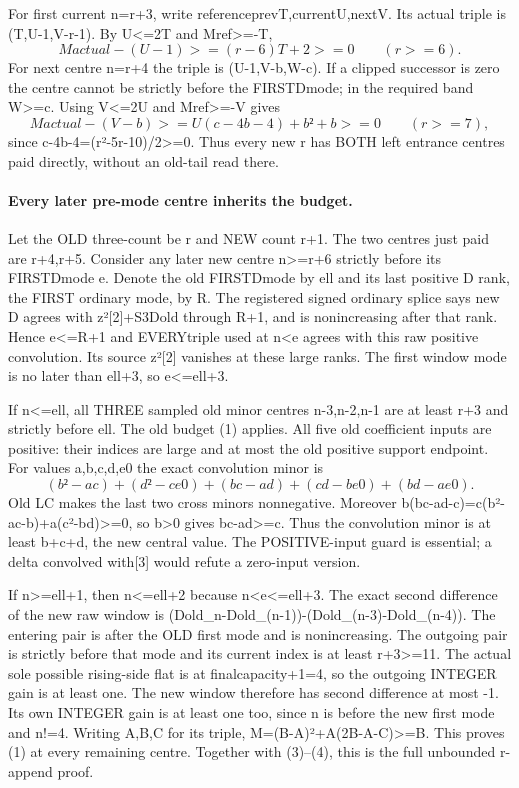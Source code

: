 For first current n=r+3, write referenceprevT,currentU,nextV.
Its actual triple is (T,U-1,V-r-1). By U<=2T and Mref>=-T,
\[
 Mactual-(U-1)>= (r-6)T+2>=0\qquad(r>=6).               \tag{3}
\]
For next centre n=r+4 the triple is (U-1,V-b,W-c).
If a clipped successor is zero the centre cannot be strictly before
the FIRSTDmode; in the required band W>=c. Using V<=2U and
Mref>=-V gives
\[
 Mactual-(V-b)>=U(c-4b-4)+b²+b>=0\qquad(r>=7),          \tag{4}
\]
since c-4b-4=(r²-5r-10)/2>=0. Thus every new r has BOTH
left entrance centres paid directly, without an old-tail read there.

\paragraph{Every later pre-mode centre inherits the budget.}
Let the OLD three-count be r and NEW count r+1. The two centres
just paid are r+4,r+5. Consider any later new centre n>=r+6 strictly
before its FIRSTDmode e. Denote the old FIRSTDmode by ell and its
last positive D rank, the FIRST ordinary mode, by R.
The registered signed ordinary splice says new D agrees with
z²[2]+S3Dold through R+1, and is nonincreasing after that rank.
Hence e<=R+1 and EVERYtriple used at n<e agrees with this raw
positive convolution. Its source z²[2] vanishes at these large ranks.
The first window mode is no later than ell+3, so e<=ell+3.

If n<=ell, all THREE sampled old minor centres n-3,n-2,n-1
are at least r+3 and strictly before ell. The old budget (1) applies.
All five old coefficient inputs are positive: their indices are
large and at most the old positive support endpoint. For values
a,b,c,d,e0 the exact convolution minor is
\[
 (b²-ac)+(d²-ce0)+(bc-ad)+(cd-be0)+(bd-ae0).
\]
Old LC makes the last two cross minors nonnegative. Moreover
b(bc-ad-c)=c(b²-ac-b)+a(c²-bd)>=0,
so b>0 gives bc-ad>=c. Thus the convolution minor is at least
b+c+d, the new central value. The POSITIVE-input guard is essential;
a delta convolved with[3] would refute a zero-input version.

If n>=ell+1, then n<=ell+2 because n<e<=ell+3. The exact
second difference of the new raw window is
(Dold_n-Dold_(n-1))-(Dold_(n-3)-Dold_(n-4)).
The entering pair is after the OLD first mode and is nonincreasing.
The outgoing pair is strictly before that mode and its current index
is at least r+3>=11. The actual sole possible rising-side flat is
at finalcapacity+1=4, so the outgoing INTEGER gain is at least one.
The new window therefore has second difference at most -1.
Its own INTEGER gain is at least one too, since n is before the
new first mode and n!=4. Writing A,B,C for its triple,
M=(B-A)²+A(2B-A-C)>=B. This proves (1) at every remaining centre.
Together with (3)--(4), this is the full unbounded r-append proof.

